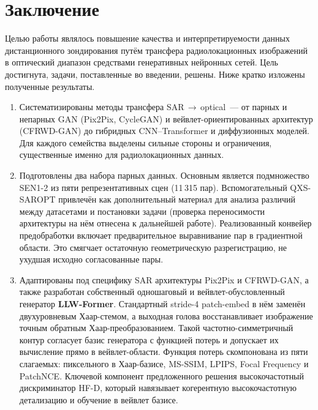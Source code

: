 \chapter{Заключение}
\label{sec:Chapter6} 

Целью работы являлось повышение качества и интерпретируемости данных
дистанционного зондирования путём трансфера радиолокационных изображений в
оптический диапазон средствами генеративных нейронных сетей. Цель достигнута,
задачи, поставленные во введении, решены. Ниже кратко изложены полученные
результаты.

\begin{enumerate}[label*=\arabic*.,leftmargin=2.0em,itemsep=0.3em,topsep=0.3em]
  \item Систематизированы методы трансфера SAR\,$\rightarrow$\,optical~--- от парных
        и непарных GAN (Pix2Pix, CycleGAN) и вейвлет-ориентированных архитектур
        (CFRWD-GAN) до гибридных CNN--Transformer и диффузионных моделей. Для каждого
        семейства выделены сильные стороны и ограничения, существенные именно для
        радиолокационных данных.
  \item Подготовлены два набора парных данных. Основным является подмножество SEN1-2 из
        пяти репрезентативных сцен (11\,315 пар). Вспомогательный QXS-SAROPT
        привлечён как дополнительный материал для анализа различий между датасетами
        и постановки задачи (проверка переносимости архитектуры на нём отнесена к
        дальнейшей работе). Реализованный конвейер предобработки
        включает предварительное выравнивание пар в градиентной области.
        Это смягчает остаточную геометрическую разрегистрацию, не ухудшая исходно
        согласованные пары.
  \item Адаптированы под специфику SAR архитектуры Pix2Pix и CFRWD-GAN, а также
        разработан собственный одношаговый и
        вейвлет-обусловленный генератор \textbf{LLW-Former}. Стандартный stride-4 patch-embed в нём заменён
        двухуровневым Хаар-стемом, а выходная голова восстанавливает изображение
        точным обратным Хаар-преобразованием. Такой частотно-симметричный контур
        согласует базис генератора с функцией потерь и допускает их вычисление прямо
        в вейвлет-области. Функция потерь скомпонована из пяти слагаемых: пиксельного
        в Хаар-базисе, MS-SSIM, LPIPS, Focal Frequency и PatchNCE. Ключевой компонент
        предложенного решения высокочастотный дискриминатор HF-D, который навязывает
        когерентную высокочастотную детализацию и обучение в вейвлет базисе.

\end{enumerate}

